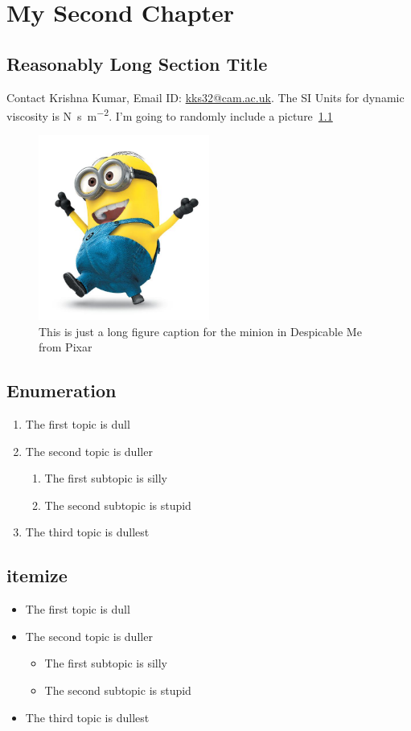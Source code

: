 \chapter{My Second Chapter}
\section[Short title]{Reasonably Long Section Title}

Contact Krishna Kumar, Email ID: \href{mailto:kks32@cam.ac.uk}{kks32@cam.ac.uk}. The SI Units for dynamic viscosity is \si{\newton\second\per\metre\squared}. I'm going to randomly include a picture~\cref{fig:minion}


\begin{figure}[htbp!] 
\centering    
\includegraphics[width=0.5\textwidth]{Chapter2/Figs/minion.jpg}
\caption[Minion]{This is just a long figure caption for the minion in Despicable Me from Pixar}
\label{fig:minion}
\end{figure}


\section*{Enumeration}
\begin{enumerate}
\item The first topic is dull
\item The second topic is duller
\begin{enumerate}
\item The first subtopic is silly
\item The second subtopic is stupid
\end{enumerate}
\item The third topic is dullest
\end{enumerate}

\section*{itemize}
\begin{itemize}
\item The first topic is dull
\item The second topic is duller
\begin{itemize}
\item The first subtopic is silly
\item The second subtopic is stupid
\end{itemize}
\item The third topic is dullest
\end{itemize}

